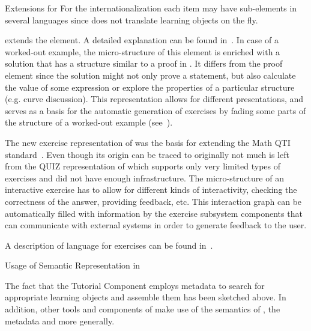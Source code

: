 \begin{omgroup}[id=activemath,short=ActiveMath,
  creators={melis,goguadse,alberto,frischauf,homik,libbrecht,cullrich}]
\begin{omgroup}{{\omdoc} Extensions for {\activemath}}
For the internationalization each {\omdoc} item may have sub-elements in several languages
since {\activemath} does not translate learning objects on the fly.

{\activemath} extends the {\omdoc} {} element. A detailed explanation can
be found in~\cite{Melisetal-FadedEx-ITS04-2004}.  In case of a worked-out example, the
micro-structure of this element is enriched with a solution that has a structure similar
to a proof in {\omdoc}.  It differs from the proof element since the solution might not
only prove a statement, but also calculate the value of some expression or explore the
properties of a particular structure (e.g. curve discussion).  This representation allows
for different presentations, and serves as a basis for the automatic generation of
exercises by fading some parts of the structure of a worked-out example
(see~\cite{Melisetal-FadedEx-ITS04-2004}).

The new exercise representation of {\activemath} was the basis for extending the Math QTI
standard~\cite{ENCS04}. Even though its origin can be traced to {\omdoc} originally not
much is left from the QUIZ representation of {\omdoc} which supports only very limited
types of exercises and did not have enough infrastructure.  The micro-structure of an
interactive exercise has to allow for different kinds of interactivity, checking the
correctness of the answer, providing feedback, etc.
This interaction graph can be automatically filled with information  
by the exercise subsystem components that can communicate with external systems in order 
to generate feedback to the user.

A description of {\activemath} language for exercises can be found in~\cite{icce05}.
\end{omgroup}

\begin{omgroup}{Usage of Semantic Representation in {\activemath}}

The fact that the Tutorial Component employs metadata to search for appropriate learning
objects and assemble them has been sketched above. In addition, other tools and components
of {\activemath} make use of the semantics of {\openmath}, the {\activemath} metadata and
{\omdoc} more generally.


\end{omgroup}
\end{omgroup}
